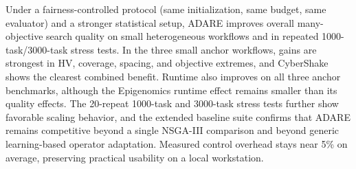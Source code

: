 \documentclass[runningheads]{llncs}
\begin{document}
Under a fairness-controlled protocol (same initialization, same budget, same evaluator) and a stronger statistical setup, ADARE improves overall many-objective search quality on small heterogeneous workflows and in repeated 1000-task/3000-task stress tests. In the three small anchor workflows, gains are strongest in HV, coverage, spacing, and objective extremes, and CyberShake shows the clearest combined benefit. Runtime also improves on all three anchor benchmarks, although the Epigenomics runtime effect remains smaller than its quality effects. The 20-repeat 1000-task and 3000-task stress tests further show favorable scaling behavior, and the extended baseline suite confirms that ADARE remains competitive beyond a single NSGA-III comparison and beyond generic learning-based operator adaptation. Measured control overhead stays near 5\% on average, preserving practical usability on a local workstation.
\end{document}
